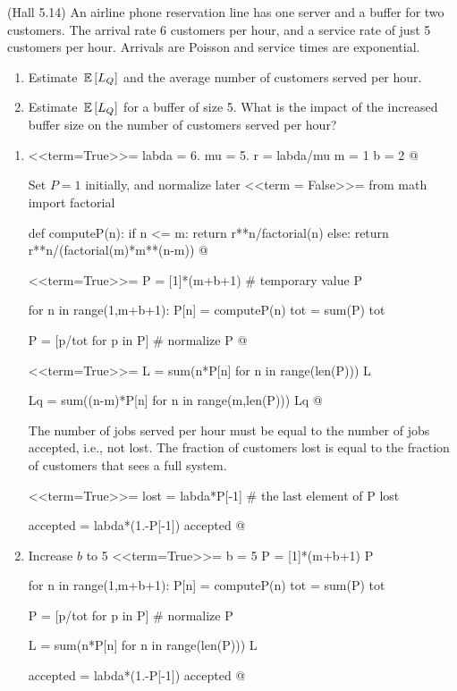 \begin{question}
  (Hall 5.14) An airline phone reservation line has one server and a
  buffer for two customers. The arrival rate 6 customers per hour, and
  a service rate of just 5 customers per hour. Arrivals are Poisson and service times are exponential. 
  \begin{enumerate}
  \item Estimate $\,\mathbb{E}\left[L_Q\right]$ and the average number of customers served per hour.
  \item Estimate $\,\mathbb{E}\left[L_Q\right]$ for a buffer of size 5. What is the impact of the increased buffer size on the number of customers served per hour?
  \end{enumerate}
  
    \begin{solution}
      \begin{enumerate}

      \item 

<<term=True>>=
labda = 6.
mu = 5.
r = labda/mu
m = 1
b = 2
@ 

Set $P = 1$ initially, and normalize later
<<term = False>>=
from math import factorial

def computeP(n):
    if n <= m:
       return r**n/factorial(n)
    else:
       return r**n/(factorial(m)*m**(n-m))
@

<<term=True>>=
P = [1]*(m+b+1) # temporary value
P

for n in range(1,m+b+1):
    P[n] = computeP(n)
tot = sum(P)
tot

P = [p/tot for p in P] # normalize
P
@ 

<<term=True>>=
L = sum(n*P[n] for n in range(len(P)))
L

Lq = sum((n-m)*P[n] for n in range(m,len(P)))
Lq
@ 


The number of jobs served per hour must be equal to the number of jobs
accepted, i.e., not lost. The fraction of customers lost is equal to
the fraction of customers that sees a full system.

<<term=True>>=
lost = labda*P[-1] # the last element of P
lost

accepted = labda*(1.-P[-1])
accepted
@  

\item 

 Increase $b$ to 5
<<term=True>>=
b = 5
P = [1]*(m+b+1)
P

for n in range(1,m+b+1):
    P[n] = computeP(n)
tot = sum(P)
tot

P = [p/tot for p in P] # normalize
P

L = sum(n*P[n] for n in range(len(P)))
L

accepted = labda*(1.-P[-1])
accepted
@      
  \end{enumerate}
    \end{solution}
\end{question}

